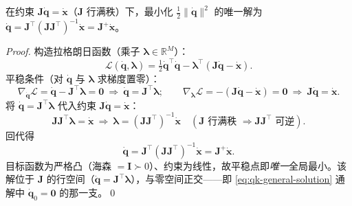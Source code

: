 \begin{theorem}[MP 伪逆的最小范数性质]\label{thm:qk-mp-minnorm}
在约束 $\mathbf{J}\dot{\boldsymbol{q}}=\dot{\boldsymbol{x}}$（$\mathbf{J}$ 行满秩）下，最小化 $\tfrac12\|\dot{\boldsymbol{q}}\|^2$ 的唯一解为 $\dot{\boldsymbol{q}}=\mathbf{J}^\top(\mathbf{J}\mathbf{J}^\top)^{-1}\dot{\boldsymbol{x}}=\mathbf{J}^{+}\dot{\boldsymbol{x}}$。
\end{theorem}
\begin{proof}
构造拉格朗日函数（乘子 $\boldsymbol{\lambda}\in\mathbb{R}^M$）\cite{yu2021quadruped}：
\begin{equation}
  \mathcal{L}(\dot{\boldsymbol{q}},\boldsymbol{\lambda})=\tfrac12\dot{\boldsymbol{q}}^\top\dot{\boldsymbol{q}}-\boldsymbol{\lambda}^\top(\mathbf{J}\dot{\boldsymbol{q}}-\dot{\boldsymbol{x}}).
  \label{eq:qk-lagrangian}
\end{equation}
平稳条件（对 $\dot{\boldsymbol{q}}$ 与 $\boldsymbol{\lambda}$ 求梯度置零）：
\begin{equation}
  \nabla_{\dot{\boldsymbol{q}}}\mathcal{L}=\dot{\boldsymbol{q}}-\mathbf{J}^\top\boldsymbol{\lambda}=\mathbf{0}\ \Rightarrow\ \dot{\boldsymbol{q}}=\mathbf{J}^\top\boldsymbol{\lambda};
  \qquad
  \nabla_{\boldsymbol{\lambda}}\mathcal{L}=-(\mathbf{J}\dot{\boldsymbol{q}}-\dot{\boldsymbol{x}})=\mathbf{0}\ \Rightarrow\ \mathbf{J}\dot{\boldsymbol{q}}=\dot{\boldsymbol{x}}.
  \label{eq:qk-stationary}
\end{equation}
将 $\dot{\boldsymbol{q}}=\mathbf{J}^\top\boldsymbol{\lambda}$ 代入约束 $\mathbf{J}\dot{\boldsymbol{q}}=\dot{\boldsymbol{x}}$：
\begin{equation}
  \mathbf{J}\mathbf{J}^\top\boldsymbol{\lambda}=\dot{\boldsymbol{x}}
  \ \Rightarrow\ \boldsymbol{\lambda}=(\mathbf{J}\mathbf{J}^\top)^{-1}\dot{\boldsymbol{x}}
  \quad(\mathbf{J}\text{ 行满秩 }\Rightarrow\mathbf{J}\mathbf{J}^\top\text{ 可逆}).
  \label{eq:qk-lambda-solve}
\end{equation}
回代得
\begin{equation}
  \dot{\boldsymbol{q}}=\mathbf{J}^\top(\mathbf{J}\mathbf{J}^\top)^{-1}\dot{\boldsymbol{x}}=\mathbf{J}^{+}\dot{\boldsymbol{x}}.
  \label{eq:qk-mp-result}
\end{equation}
目标函数为严格凸（海森 $=\mathbf{I}\succ0$）、约束为线性，故平稳点即\emph{唯一}全局最小。该解位于 $\mathbf{J}$ 的行空间（$\dot{\boldsymbol{q}}=\mathbf{J}^\top\boldsymbol{\lambda}$），与零空间正交——即 \cref{eq:qk-general-solution} 通解中 $\dot{\boldsymbol{q}}_0=\mathbf{0}$ 的那一支。\qed
\end{proof}

